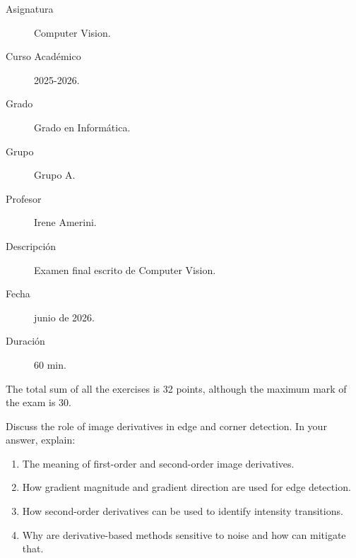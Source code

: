 \documentclass[12pt]{article}
\begin{document}

    
	

    \begin{description}
        \item[Asignatura] Computer Vision.
        \item[Curso Académico] 2025-2026.
        \item[Grado] Grado en Informática.
        \item[Grupo] Grupo A.
        \item[Profesor] Irene Amerini.
        \item[Descripción] Examen final escrito de Computer Vision.
        \item[Fecha] junio de 2026.
        \item[Duración] 60 min.
    
    \end{description}
    \newpage


    \begin{observacion}
        The total sum of all the exercises is 32 points, although the maximum mark of the exam is 30.
    \end{observacion}

    \begin{ejercicio}[8 points]
    Discuss the role of image derivatives in edge and corner detection. In your answer, explain:
    \begin{enumerate}
        \item[a)] The meaning of first-order and second-order image derivatives.
        \item[b)] How gradient magnitude and gradient direction are used for edge detection.
        \item[c)] How second-order derivatives can be used to identify intensity transitions.
        \item[d)] Why are derivative-based methods sensitive to noise and how can mitigate that.
    \end{enumerate}
    \end{ejercicio}
\end{document}
